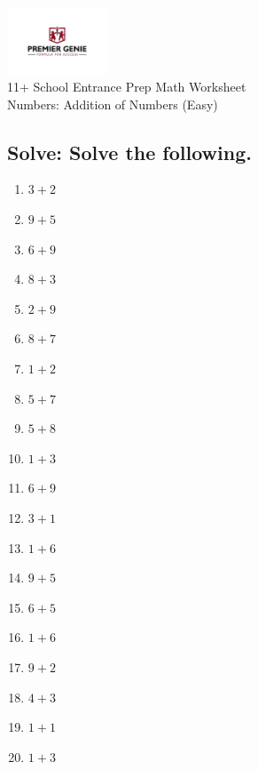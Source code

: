 \documentclass{article}
\begin{document}
\begin{center}
\includegraphics[width=3cm]{PREMGENIEJPG.jpg}\\
{\Large 11+ School Entrance Prep Math Worksheet}\\
{\Medium Numbers: Addition of Numbers (Easy)}\\

\end{center}

\subsection*{Solve: Solve the following.}

\begin{enumerate}
\item $\displaystyle {3}+{2} $ \ 
\item $\displaystyle {9}+{5} $ \ 
\item $\displaystyle {6}+{9} $ \ 
\item $\displaystyle {8}+{3} $ \ 
\item $\displaystyle {2}+{9} $ \ 
\item $\displaystyle {8}+{7} $ \ 
\item $\displaystyle {1}+{2} $ \ 
\item $\displaystyle {5}+{7} $ \ 
\item $\displaystyle {5}+{8} $ \ 
\item $\displaystyle {1}+{3} $ \ 
\item $\displaystyle {6}+{9} $ \ 
\item $\displaystyle {3}+{1} $ \ 
\item $\displaystyle {1}+{6} $ \ 
\item $\displaystyle {9}+{5} $ \ 
\item $\displaystyle {6}+{5} $ \ 
\item $\displaystyle {1}+{6} $ \ 
\item $\displaystyle {9}+{2} $ \ 
\item $\displaystyle {4}+{3} $ \ 
\item $\displaystyle {1}+{1} $ \ 
\item $\displaystyle {1}+{3} $ \ 


\end{enumerate}
\end{document}
